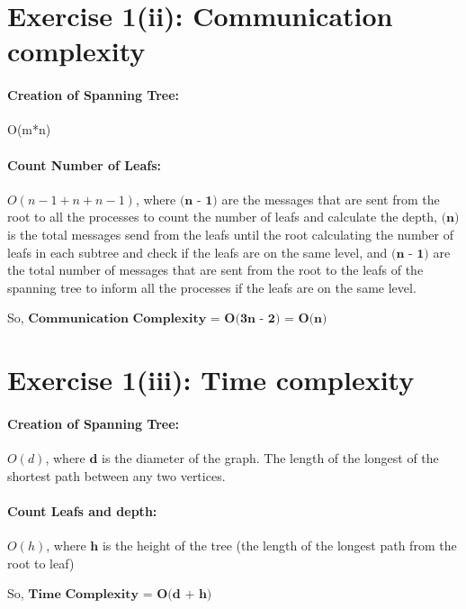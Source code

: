 \section*{Exercise 1(ii): Communication complexity}

\paragraph{Creation of Spanning Tree:} O(m*n)

\paragraph{Count Number of Leafs:} $O(n - 1 + n + n - 1)$, where
$\textbf{(n - 1)}$ are the messages that are sent from the root to all
the processes to count the number of leafs and calculate the depth,
%
$\textbf{(n)}$ is the total messages send from the leafs until the
root calculating the number of leafs in each subtree and check if the
leafs are on the same level, and
%
$\textbf{(n - 1)}$ are the total number of messages that are sent from
the root to the leafs of the spanning tree to inform all the processes
if the leafs are on the same level.

\medskip
So, $\textbf{Communication Complexity = O(3n - 2) = O(n)} $

\section*{Exercise 1(iii): Time complexity}
\paragraph{Creation of Spanning Tree:} $O(d)$, where $\textbf{d}$ is
the diameter of the graph. The length of the longest of the shortest
path between any two vertices.
\paragraph{Count Leafs and depth:} $O(h)$, where $\textbf{h}$ is the
height of the tree (the length of the longest path from the root to
leaf)

\medskip
So, $\textbf{Time Complexity = O(d + h)} $
